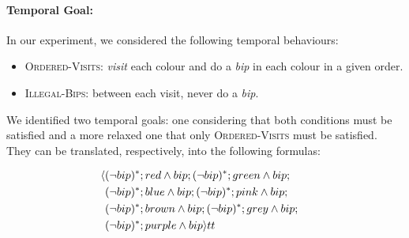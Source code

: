 \paragraph{Temporal Goal:} In our experiment, we considered the following temporal behaviours:
\begin{itemize}
	\item \textsc{Ordered-Visits}: \emph{visit} each colour and do a \emph{bip} in each colour in a given order.
	\item \textsc{Illegal-Bips}: between each visit, never do a \emph{bip}. 
\end{itemize}

We identified two temporal goals: one considering that both conditions must be satisfied and a more relaxed one that only \textsc{Ordered-Visits} must be satisfied. They can be translated, respectively, into the following \LDLf formulas:

\begin{align}\label{eq:sapientino-temporal-goal}
\langle &(\lnot bip)^*;red \wedge bip;(\lnot bip)^*;green \wedge bip;& \nonumber\\
&(\lnot bip)^*;blue \wedge bip;(\lnot bip)^*;pink \wedge bip;& \nonumber\\
&(\lnot bip)^*;brown \wedge bip;(\lnot bip)^*;grey \wedge bip;&\nonumber\\
&(\lnot bip)^*;purple \wedge bip \rangle tt
\end{align}

